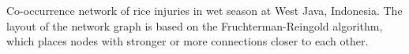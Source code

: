 Co-occurrence network of rice injuries in wet season at West Java, Indonesia. The layout of the network graph is based on the Fruchterman-Reingold algorithm, which places nodes with stronger or more connections closer to each other.
        \label{fig:networkWJ_ws}